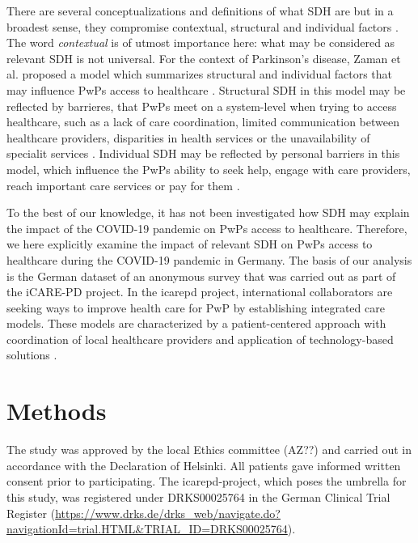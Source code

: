 \documentclass{bmcart}
\begin{document}
	There are several conceptualizations and definitions of what SDH are but in a broadest sense, they compromise contextual, structural and individual factors \cite{world2010conceptual}. The word \textit{contextual} is of utmost importance here: what may be considered as relevant SDH is not universal. For the context of Parkinson's disease, Zaman  et al. proposed a model which summarizes structural and individual factors that may influence PwPs access to healthcare \cite{zaman2021barriers}. 
	Structural SDH in this model may be reflected by barrieres, that PwPs meet on a system-level when trying to access healthcare, such as a lack of care coordination, limited communication between healthcare providers, disparities in health services or the unavailability of specialit services \cite{zaman2021barriers}. Individual SDH may be reflected by personal barriers in this model, which influence the PwPs ability to seek help, engage with care providers, reach important care services or pay for them \cite{zaman2021barriers}. 
	
	To the best of our knowledge, it has not been investigated how SDH may explain the impact of the COVID-19 pandemic on PwPs access to healthcare. Therefore, we here explicitly examine the impact of relevant SDH on PwPs access to healthcare during the COVID-19 pandemic in Germany. The basis of our analysis is the German dataset of an anonymous survey that was carried out as part of the iCARE-PD project. In the \acs{icarepd} project, international collaborators are seeking ways to improve health care for PwP by establishing integrated care models. These models are characterized by a patient-centered approach with coordination of local healthcare providers and application of technology-based solutions \cite{fabbri2020moving}.  
\fi
	

\section*{Methods}
The study was approved by the local Ethics committee (AZ??) and carried out in accordance with the Declaration of Helsinki. All patients gave informed written consent prior to participating. The \acs{icarepd}-project, which poses the umbrella for this study, was registered under DRKS00025764 in the German Clinical Trial Register (\url{https://www.drks.de/drks_web/navigate.do?navigationId=trial.HTML&TRIAL_ID=DRKS00025764}).
\end{document}
